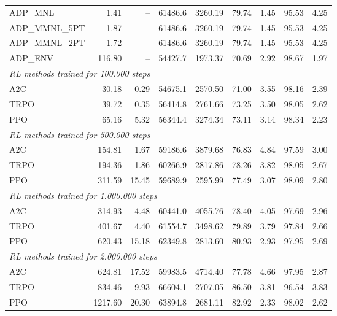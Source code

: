 \begin{samepage}
\begin{center}
\begin{tabular}{l|rr|rr|rr|rr}
    \midrule
    ADP\_MNL     &     1.41 &    -- &    61486.6 &    3260.19 &   79.74 &    1.45 &   95.53 &    4.25 \\
    ADP\_MMNL\_5PT &     1.87 &    -- &    61486.6 &    3260.19 &   79.74 &    1.45 &   95.53 &    4.25 \\
    ADP\_MMNL\_2PT &     1.72 &    -- &    61486.6 &    3260.19 &   79.74 &    1.45 &   95.53 &    4.25 \\
    ADP\_ENV     &   116.80 &    -- &    54427.7 &    1973.37 &   70.69 &    2.92 &   98.67 &    1.97 \\
    \midrule
    \multicolumn{9}{l}{\textit{RL methods trained for 100.000 steps}} \\
    \midrule
    A2C          &    30.18 &     0.29 &    54675.1 &    2570.50 &   71.00 &    3.55 &   98.16 &    2.39 \\
    TRPO         &    39.72 &     0.35 &    56414.8 &    2761.66 &   73.25 &    3.50 &   98.05 &    2.62 \\
    PPO          &    65.16 &     5.32 &    56344.4 &    3274.34 &   73.11 &    3.14 &   98.34 &    2.23 \\
    \midrule
    \multicolumn{9}{l}{\textit{RL methods trained for 500.000 steps}} \\
    \midrule
    A2C          &   154.81 &     1.67 &    59186.6 &    3879.68 &   76.83 &    4.84 &   97.59 &    3.00 \\
    TRPO         &   194.36 &     1.86 &    60266.9 &    2817.86 &   78.26 &    3.82 &   98.05 &    2.67 \\
    PPO          &   311.59 &    15.45 &    59689.9 &    2595.99 &   77.49 &    3.07 &   98.09 &    2.80 \\
    \midrule
    \multicolumn{9}{l}{\textit{RL methods trained for 1.000.000 steps}} \\
    \midrule
    A2C          &   314.93 &     4.48 &    60441.0 &    4055.76 &   78.40 &    4.05 &   97.69 &    2.96 \\
    TRPO         &   401.67 &     4.40 &    61554.7 &    3498.62 &   79.89 &    3.79 &   97.84 &    2.66 \\
    PPO          &   620.43 &    15.18 &    62349.8 &    2813.60 &   80.93 &    2.93 &   97.95 &    2.69 \\
    \midrule
    \multicolumn{9}{l}{\textit{RL methods trained for 2.000.000 steps}} \\
    \midrule
    A2C          &   624.81 &    17.52 &    59983.5 &    4714.40 &   77.78 &    4.66 &   97.95 &    2.87 \\
    TRPO         &   834.46 &     9.93 &    66604.1 &    2707.05 &   86.50 &    3.81 &   96.54 &    3.83 \\
    PPO          &  1217.60 &    20.30 &    63894.8 &    2681.11 &   82.92 &    2.33 &   98.02 &    2.62 \\
    \bottomrule
  \end{tabular}
\end{center}
\end{samepage}

